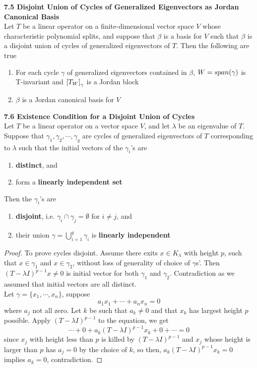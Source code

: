 \documentclass[11pt]{article}
\begin{document}
\begin{theorem*}
    \textbf{7.5 Disjoint Union of Cycles of Generalized Eigenvectors as Jordan Canonical Basis} \\
    Let $T$ be a linear operator on a finite-dimensional vector space $V$ whose characteristic polynomial splits, and suppose that $\beta$ is a basis for $V$ such that $\beta$ is a disjoint union of cycles of generalized eigenvectors of $T$. Then the following are true 
    \begin{enumerate}
        \item For each cycle $\gamma$ of generalized eigenvectors contained in $\beta$, $W = span(\gamma)$ is T-invariant and $\left[ T_W \right]_{\gamma}$ is a Jordan block 
        \item $\beta$ is a Jordan canonical basis for $V$
    \end{enumerate}
\end{theorem*}

\begin{theorem*}
    \textbf{7.6 Existence Condition for a Disjoint Union of Cycles} \\ 
    Let $T$ be a linear operator on a vector space $V$, and let $\lambda$ be an eigenvalue of $T$. Suppose that $\gamma_1, \gamma_2, \cdots, \gamma_q$ are cycles of generalized eigenvectors of $T$ corresponding to $\lambda$ such that the initial vectors of the $\gamma_i$'s are 
    \begin{enumerate}
        \item \textbf{distinct}, and
        \item form a \textbf{linearly independent set}
    \end{enumerate}
     Then the $\gamma_i$'s are 
     \begin{enumerate}
         \item \textbf{disjoint}, i.e. $\gamma_i \cap \gamma_j = \emptyset$ for $i\neq j$, and
         \item their union $\gamma = \bigcup_{i=1}^q \gamma_i$ is \textbf{linearly independent}
     \end{enumerate}
     \begin{proof}
        To prove cycles disjoint. Assume there exits $x\in K_{\lambda}$ with height $p$, such that $x\in \gamma_1$ and $x\in \gamma_2$, without loss of generality of choice of $\gamma$s'. Then $(T-\lambda I)^{p-1} x \neq 0$ is initial vector for both $\gamma_1$ and $\gamma_2$. Contradiction as we assumed that initial vectors are all distinct. \\
        Let $\gamma = \{x_1, \cdots, x_n\}$, suppose
        \[
        a_1 x_1 + \cdots + a_n x_n = 0 
        \]
        where $a_j$ not all zero. Let $k$ be such that $a_k \neq 0$ and that $x_k$ has largest height $p$ possible. Apply $(T-\lambda I)^{p-1}$ to the equation, we get 
        \[
        \cdots + 0 + a_k (T - \lambda I)^{p-1} x_k + 0 + \cdots = 0
        \]
        since $x_j$ with height less than $p$ is killed by $(T-\lambda I)^{p-1}$ and $x_j$ whose height is larger than $p$ has $a_j = 0$ by the choice of $k$, so then, $a_k (T-\lambda I)^{p-1} x_k = 0$ implies $a_k = 0$, contradiction.
     \end{proof}
\end{theorem*}
 
\end{document}
